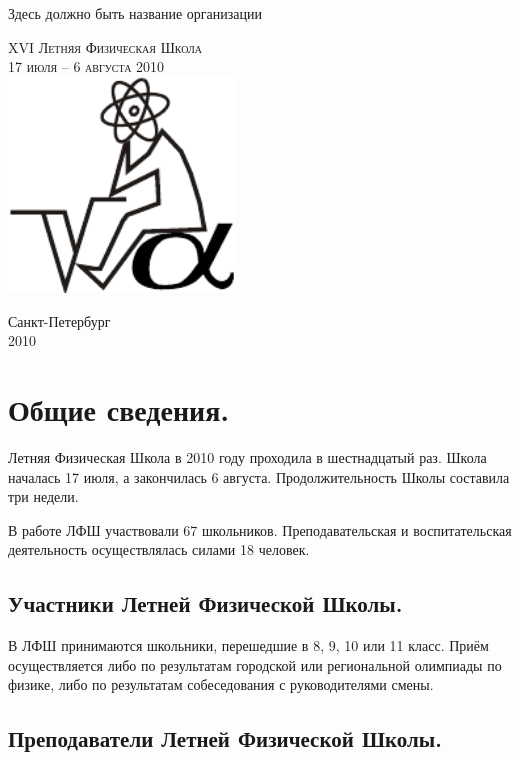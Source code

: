 \documentclass[12pt,a4paper,oneside,draft]{scrartcl}
\newlength{\h}
\newlength{\x}
\begin{document}
\parindent=5mm
\begin{center}
  \small{\textsf{Здесь должно быть название организации}}

\vfill
\LARGE{\textsc{XVI Летняя Физическая Школа}}\\
\Large{\textsc{17 июля -- 6 августа 2010}}\\[2cm]
\includegraphics[width=6cm]{logo.pdf}
\vfill

\small{\textsf{Санкт-Петербург}\\
\textsf{2010}}
\end{center}

\clearpage
\section{Общие сведения.}
\label{sec:general}

Летняя Физическая Школа в 2010 году проходила в шестнадцатый
раз. Школа началась 17 июля, а закончилась 6
августа. Продолжительность Школы составила три недели. 

В работе ЛФШ участвовали 67 школьников. Преподавательская и воспитательская
деятельность осуществлялась силами 18 человек.

\subsection{Участники Летней Физической Школы. }
\label{sec:scholars}

В ЛФШ принимаются школьники, перешедшие в 8, 9, 10 или 11 класс. Приём
осуществляется либо по результатам городской или региональной
олимпиады по физике, либо по результатам собеседования с
руководителями смены.
\smallskip






\subsection{Преподаватели Летней Физической Школы. }
\label{sec:teachers}
\end{document}
